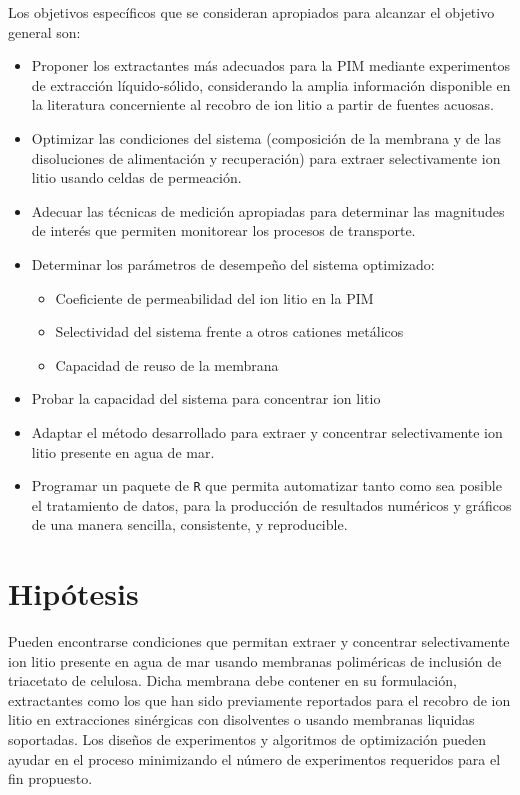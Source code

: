 Los objetivos específicos que se consideran apropiados para alcanzar el objetivo general son:
\begin{itemize}
    \item Proponer los extractantes más adecuados para la \ac{PIM} mediante experimentos de extracción líquido-sólido, considerando la amplia información disponible en la literatura concerniente al recobro de ion litio a partir de fuentes acuosas.
    \item Optimizar las condiciones del sistema (composición de la membrana y de las disoluciones de alimentación y recuperación) para extraer selectivamente ion litio usando celdas de permeación.
    \item Adecuar las técnicas de medición apropiadas para determinar las magnitudes de interés que permiten monitorear los procesos de transporte.
    \item Determinar los parámetros de desempeño del sistema optimizado:
    \begin{itemize}
        \item Coeficiente de permeabilidad del ion litio en la PIM
        \item Selectividad del sistema frente a otros cationes metálicos
        \item Capacidad de reuso de la membrana
    \end{itemize}
    \item Probar la capacidad del sistema para concentrar ion litio
    \item Adaptar el método desarrollado para extraer y concentrar selectivamente ion litio presente en agua de mar.
    \item Programar un paquete de \verb|R| que permita automatizar tanto como sea posible el tratamiento de datos, para la producción de resultados numéricos y gráficos de una manera sencilla, consistente, y reproducible.
\end{itemize}

\section{Hipótesis}
Pueden encontrarse condiciones que permitan extraer y concentrar selectivamente ion litio presente en agua de mar usando membranas poliméricas de inclusión de triacetato de celulosa. Dicha membrana debe contener en su formulación, extractantes como los que han sido previamente reportados para el recobro de ion litio en extracciones sinérgicas con disolventes o usando membranas liquidas soportadas. Los diseños de experimentos y algoritmos de optimización pueden ayudar en el proceso minimizando el número de experimentos requeridos para el fin propuesto.


